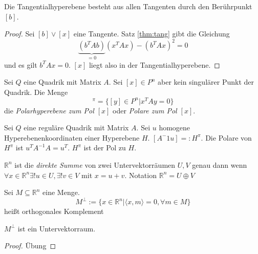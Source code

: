 \documentclass[11pt]{article}
\begin{document}
\begin{theorem}
Die Tangentialhyperebene besteht aus allen Tangenten durch den Berührpunkt $[b]$.

\end{theorem}
\begin{proof}
Sei $[b]\lor [x]$ eine Tangente.  Satz \ref{thm:tang} gibt die Gleichung \begin{equation*}
    \underbrace{(b^TAb)}_{=0}(x^TAx) - (b^TAx)^2 = 0
\end{equation*} und es gilt $b^TAx = 0$. $[x]$ liegt also in der Tangentialhyperebene.
\end{proof}

\begin{definition}
Sei $Q$ eine Quadrik mit Matrix $A$. Sei $[x]\in P^n$ aber kein singulärer Punkt der Quadrik. Die Menge \begin{equation*}
    [x]^\pi = \{[y]\in P^n| x^TAy = 0\}
\end{equation*} die \textit{Polarhyperebene zum Pol $[x]$} oder \textit{Polare zum Pol $[x]$}.
\end{definition}
\begin{remark}
Sei $Q$ eine reguläre Quadrik mit Matrix $A$. Sei $u$ homogene Hyperebenenkoordinaten einer Hyperebene $H$. $[A^-1u] =: H^\pi$. Die Polare von $H^\pi$ ist $u^TA^{-1}A = u^T$. $H^\pi$ ist der Pol zu $H$.
\end{remark}
\begin{definition}
$\mathbb R^n$ ist die \textit{direkte Summe} von zwei Untervektorräumen $U,V$ genau dann wenn $\forall x\in \mathbb R^n \exists!u\in U, \exists! v\in V$ mit $x = u+v$. Notation $\mathbb R^n = U\oplus V$
\end{definition}
\begin{definition}
Sei $M\subseteq \mathbb R^n$ eine Menge. \begin{equation*}
    M^\perp := \{x\in \mathbb R^n|\langle x,m\rangle = 0, \forall m\in M\}
\end{equation*}
heißt orthogonales Komplement
\end{definition}
\begin{lemma}
$M^\perp$ ist ein Untervektorraum.
\end{lemma}
\begin{proof}
Übung
\end{proof}
\end{document}
